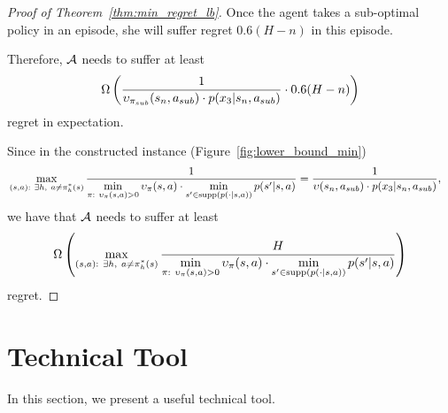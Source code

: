 \begin{proof}[Proof of Theorem~\ref{thm:min_regret_lb}]
	
	Once the agent takes a sub-optimal policy in an episode, she will suffer regret $0.6(H-n)$ in this episode.
	
	Therefore, $\mathcal{A}$ needs to suffer at least 
	$$
	\Omega \left( \frac{1}{\upsilon_{\pi_{sub}}(s_n,a_{sub}) \cdot p(x_3|s_n,a_{sub})} \cdot 0.6(H-n) \right)
	$$
	regret in expectation.
	
	
	Since in the constructed instance (Figure~\ref{fig:lower_bound_min})
	\begin{align*}
		&\max_{\begin{subarray}{c} (s,a):\ \exists h,\ a \neq \pi^{*}_h(s) \end{subarray}} \frac{1}{\min \limits_{\begin{subarray}{c} \pi: \ \upsilon_{\pi}(s,a)>0 \end{subarray}} \upsilon_{\pi}(s,a) \cdot \min \limits_{s' \in \textup{supp}( p(\cdot|s,a))} p(s'|s,a) } = \frac{1}{\upsilon(s_n,a_{sub}) \cdot p(x_3|s_n,a_{sub})} ,
	\end{align*} 
	we have that $\mathcal{A}$ needs to suffer at least
	\begin{align*}
		\Omega \left(  \max_{\begin{subarray}{c} (s,a):\  \exists h,\ a \neq \pi^{*}_h(s) \end{subarray}} \frac{ H }{\min \limits_{\begin{subarray}{c} \pi: \  \upsilon_{\pi}(s,a)>0 \end{subarray}} \upsilon_{\pi}(s,a) \cdot \min \limits_{s' \in \textup{supp}( p(\cdot|s,a))} p(s'|s,a) }  \right) 
	\end{align*}
	regret.
\end{proof}

\section{Technical Tool}

In this section, we present a useful technical tool.

